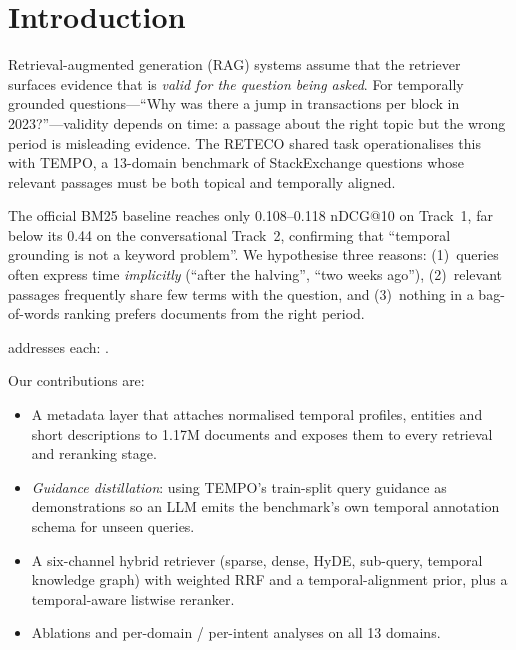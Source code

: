 \section{Introduction}
\label{sec:intro}

Retrieval-augmented generation (RAG) systems assume that the retriever surfaces evidence that is
\emph{valid for the question being asked}. For temporally grounded questions---``Why was there a
jump in transactions per block in 2023?''---validity depends on time: a passage about the right
topic but the wrong period is misleading evidence. The RETECO shared task
\citep{abdallah2026tempo,ali2026recor} operationalises this with TEMPO, a 13-domain benchmark of
StackExchange questions whose relevant passages must be both topical and temporally aligned.

The official BM25 baseline reaches only 0.108--0.118 nDCG@10 on Track~1, far below its
0.44 on the conversational Track~2, confirming that ``temporal grounding is not a keyword
problem''. We hypothesise three reasons: (1)~queries often express time \emph{implicitly}
(``after the halving'', ``two weeks ago''), (2)~relevant passages frequently share few terms
with the question, and (3)~nothing in a bag-of-words ranking prefers documents from the
right period.

\sys addresses each: .

Our contributions are:
\begin{itemize}
  \item A metadata layer that attaches normalised temporal profiles, entities and short
        descriptions to 1.17M documents and exposes them to every retrieval and reranking stage.
  \item \emph{Guidance distillation}: using TEMPO's train-split query guidance as demonstrations so
        an LLM emits the benchmark's own temporal annotation schema for unseen queries.
  \item A six-channel hybrid retriever (sparse, dense, HyDE, sub-query, temporal knowledge graph)
        with weighted RRF and a temporal-alignment prior, plus a temporal-aware listwise reranker.
  \item Ablations and per-domain / per-intent analyses on all 13 domains.
\end{itemize}
